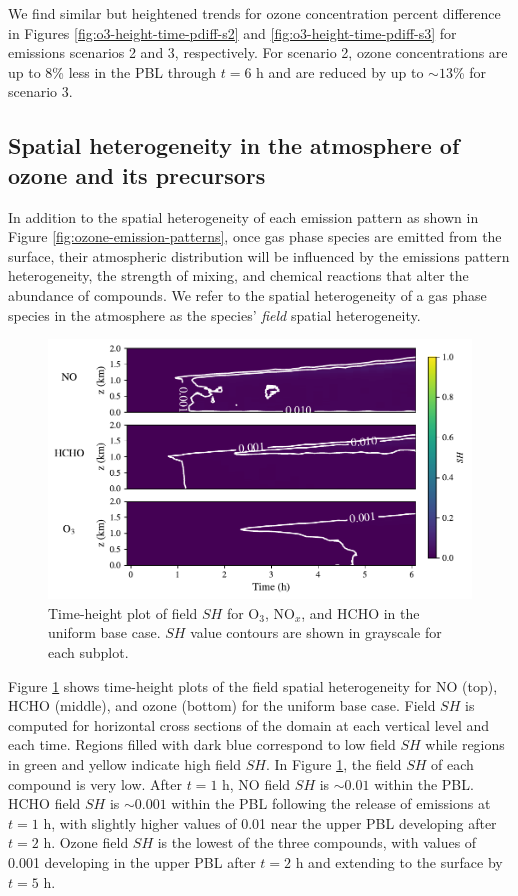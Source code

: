 We find similar but heightened trends for ozone concentration percent difference in Figures \ref{fig:o3-height-time-pdiff-s2} and \ref{fig:o3-height-time-pdiff-s3} for emissions scenarios 2 and 3, respectively. For scenario 2, ozone concentrations are up to 8\% less in the PBL through $t=6$ h and are reduced by up to $\sim13$\% for scenario 3.

\subsection{Spatial heterogeneity in the atmosphere of ozone and its precursors}

In addition to the spatial heterogeneity of each emission pattern as shown in Figure \ref{fig:ozone-emission-patterns}, once gas phase species are emitted from the surface, their atmospheric distribution will be influenced by the emissions pattern heterogeneity, the strength of mixing, and chemical reactions that alter the abundance of compounds. We refer to the spatial heterogeneity of a gas phase species in the atmosphere as the species' {\it field} spatial heterogeneity. 

\begin{figure}[h]
    \centering
    \includegraphics[width=.97\textwidth]{figures/chapter4/height-time-nsh-multivar-uniform-basecase.pdf}
    \caption{Time-height plot of field $SH$ for O$_3$, NO$_x$, and HCHO in the uniform base case. $SH$ value contours are shown in grayscale for each subplot.}
    \label{fig:atmos-sh-ub}
  \end{figure}

Figure \ref{fig:atmos-sh-ub} shows time-height plots of the field spatial heterogeneity for NO (top), HCHO (middle), and ozone (bottom) for the uniform base case. Field $SH$ is computed for horizontal cross sections of the domain at each vertical level and each time. Regions filled with dark blue correspond to low field $SH$ while regions in green and yellow indicate high field $SH$. In Figure \ref{fig:atmos-sh-ub}, the field $SH$ of each compound is very low. After $t=1$ h, NO field $SH$ is $\sim0.01$ within the PBL. HCHO field $SH$ is $\sim0.001$ within the PBL following the release of emissions at $t=1$ h, with slightly higher values of 0.01 near the upper PBL developing after $t=2$ h. Ozone field $SH$ is the lowest of the three compounds, with values of 0.001 developing in the upper PBL after $t=2$ h and extending to the surface by $t=5$ h.

